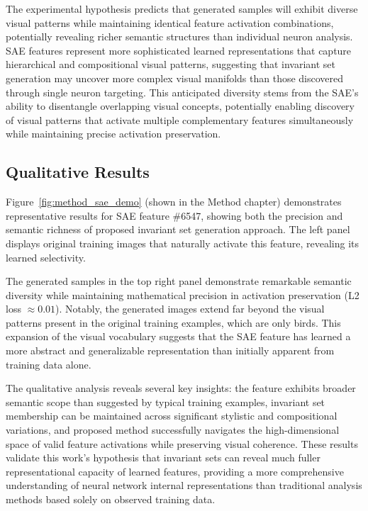 The experimental hypothesis predicts that generated samples will exhibit diverse visual patterns while maintaining identical feature activation combinations, potentially revealing richer semantic structures than individual neuron analysis. SAE features represent more sophisticated learned representations that capture hierarchical and compositional visual patterns, suggesting that invariant set generation may uncover more complex visual manifolds than those discovered through single neuron targeting. This anticipated diversity stems from the SAE's ability to disentangle overlapping visual concepts, potentially enabling discovery of visual patterns that activate multiple complementary features simultaneously while maintaining precise activation preservation.

\subsection{Qualitative Results}

Figure~\ref{fig:method_sae_demo} (shown in the Method chapter) demonstrates representative results for SAE feature \#6547, showing both the precision and semantic richness of proposed invariant set generation approach. The left panel displays original training images that naturally activate this feature, revealing its learned selectivity.

The generated samples in the top right panel demonstrate remarkable semantic diversity while maintaining mathematical precision in activation preservation (L2 loss $\approx 0.01$). Notably, the generated images extend far beyond the visual patterns present in the original training examples, which are only birds. This expansion of the visual vocabulary suggests that the SAE feature has learned a more abstract and generalizable representation than initially apparent from training data alone.

The qualitative analysis reveals several key insights: the feature exhibits broader semantic scope than suggested by typical training examples, invariant set membership can be maintained across significant stylistic and compositional variations, and proposed method successfully navigates the high-dimensional space of valid feature activations while preserving visual coherence. These results validate this work's hypothesis that invariant sets can reveal much fuller representational capacity of learned features, providing a more comprehensive understanding of neural network internal representations than traditional analysis methods based solely on observed training data.

